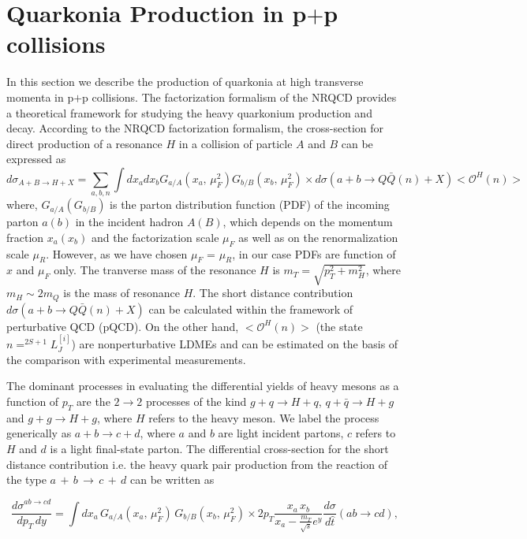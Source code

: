 \documentclass[aps,prc,preprint,superscriptaddress,showpacs,showkeys,amsmath]{revtex4-1}
\begin{document}
\section{Quarkonia Production in p$+$p collisions}
\label{section:ppProduction}
In this section we describe the production of quarkonia at high transverse
momenta in p$+$p collisions. The factorization formalism of the NRQCD  provides a theoretical 
framework for studying the heavy quarkonium production and decay. 
According to the NRQCD factorization  formalism, the cross-section for direct production of a resonance $H$ in a collision of 
particle $A$ and $B$ can be expressed as 
\begin{equation}
  d\sigma_{A+B\rightarrow H+X} = \sum_{a,b,n}\int dx_a dx_b  G_{a/A}(x_a,\,\mu^{2}_{F}) 
  G_{b/B}(x_b,\,\mu^{2}_{F})\times d\sigma(a+b\rightarrow Q\bar Q(n) +X)<\mathcal{O}^H(n)>
\end{equation}
where, $G_{a/A}(G_{b/B})$ is the parton distribution function (PDF) of the incoming parton $a(b)$ in the incident hadron $A(B)$, which depends on 
the momentum fraction $x_a(x_b)$ and the factorization scale $\mu_F$ as well as on the renormalization scale $\mu_R$. However, 
as we have chosen $\mu_F$ = $\mu_R$, in our case PDFs are function of $x$ and $\mu_F$ only. The tranverse mass of the 
resonance $H$ is $m_T = \sqrt{p_T^2 + m_H^2}$, where $m_H\sim2m_Q$ is the mass of resonance $H$. The short distance 
contribution $d\sigma(a+b\rightarrow Q\bar Q(n) +X)$ can be calculated within the framework of perturbative QCD (pQCD). 
On the other hand, $<\mathcal{O}^H(n)>$ (the state $n=^{2S+1}L^{[i]}_J$) are nonperturbative LDMEs and can be estimated on the basis of 
the comparison with experimental measurements. 

The dominant processes in evaluating the differential 
yields of heavy mesons as a function of $p_T$ are the $2\rightarrow 2$
processes of the kind $g+q\rightarrow H+q$, $q+\bar{q}\rightarrow H+g$ and
$g+g\rightarrow H+g$, where $H$ refers to the heavy meson. We label the process
generically as $a+b\rightarrow c+d$, where $a$ and $b$ are light incident
partons, $c$ refers to $H$ and $d$ is a light final-state parton. The differential cross-section 
for the short distance contribution i.e. the heavy quark pair production 
from the reaction of the type $a\,+\,b\,\rightarrow\,c\,+\,d$ can be written as~\cite{Owens:1986mp}

\begin{equation}
  \frac{{d\sigma}^{ab\rightarrow cd}}{dp_T\,dy} = \int dx_a\, G_{a/A}(x_a,\,\mu^{2}_{F})\, G_{b/B}(x_b,\,\mu^{2}_{F})\times 
  2p_T \frac{x_a\,x_b}{x_a-\frac{m_T}{\sqrt{s}}e^y}\frac{d\sigma}{d\hat t}(ab\rightarrow cd),
\end{equation}
\end{document}
